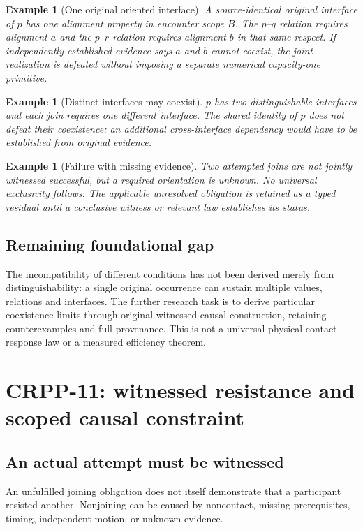 \documentclass[11pt]{article}
\newtheorem{example}[definition]{Example}
\begin{document}
\begin{example}[One original oriented interface]
A source-identical original interface of $p$ has
one alignment property in encounter scope $B$.
The $p$--$q$ relation requires alignment $a$ and
the $p$--$r$ relation requires alignment $b$
in that same respect. If independently established
evidence says $a$ and $b$ cannot coexist, the
joint realization is defeated without imposing a
separate numerical capacity-one primitive.
\end{example}
\begin{example}[Distinct interfaces may coexist]
$p$ has two distinguishable interfaces and each
join requires one different interface. The shared
identity of $p$ does not defeat their coexistence:
an additional cross-interface dependency would
have to be established from original evidence.
\end{example}
\begin{example}[Failure with missing evidence]
Two attempted joins are not jointly witnessed
successful, but a required orientation is unknown.
No universal exclusivity follows. The applicable
unresolved obligation is retained as a typed
residual until a conclusive witness or relevant
law establishes its status.
\end{example}

\subsection{Remaining foundational gap}
The incompatibility of different conditions has not
been derived merely from distinguishability: a single
original occurrence can sustain multiple values,
relations and interfaces. The further research task
is to derive particular coexistence limits through
original witnessed causal construction, retaining
counterexamples and full provenance. This is not
a universal physical contact-response law or
a measured efficiency theorem.


\section{CRPP-11: witnessed resistance and scoped causal constraint}
\label{sec:crpp11}

\subsection{An actual attempt must be witnessed}
An unfulfilled joining obligation does not itself demonstrate
that a participant resisted another. Nonjoining can be
caused by noncontact, missing prerequisites, timing,
independent motion, or unknown evidence.
\end{document}
